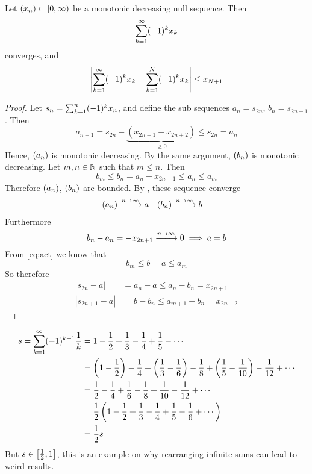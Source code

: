 \documentclass[../../script.tex]{subfiles}
\begin{document}
\begin{thm}\label{thm:alttest}
Let $\seq{x} \subset [0, \infty)$ be a monotonic decreasing null sequence. Then
\[
	\series{k} (-1)^k x_k
\]
converges, and
\[
	\left| \series{k} (-1)^k x_k - \series[N]{k} (-1)^k x_k \right| \le x_{N+1}
\]
\end{thm}
\begin{proof}
Let $s_n = \series[n]{k} (-1)^k x_n$, and define the sub sequences $a_n = s_{2n}$, $b_n = s_{2n+1}$. Then
\begin{equation}
	a_{n+1} = s_{2n} - \underbrace{(x_{2n+1} - x_{2n+2})}_{\ge 0} \le s_{2n} = a_n
\end{equation}
Hence, $\seq{a}$ is monotonic decreasing. By the same argument, $\seq{b}$ is monotonic decreasing. Let $m, n \in \natn$ such that $m \le n$. Then
\begin{equation}\label{eq:act}
	b_m \le b_n = a_n - x_{2n+1} \le a_n \le a_m
\end{equation}
Therefore $\seq{a}$, $\seq{b}$ are bounded. By , these sequence converge
\begin{align}
	\seq{a} &\convinf a & \seq{b} &\convinf b
\end{align}
Furthermore
\begin{equation}
	b_n - a_n = -x_{2n+1} \convinf 0 \implies a = b
\end{equation}
From \cref{eq:act} we know that
\begin{equation}
	b_m \le b = a \le a_m
\end{equation}
So therefore
\begin{align}
	|s_{2n} - a| &= a_n - a \le a_n - b_n = x_{2n+1} \\
	|s_{2n+1} - a| &= b - b_n \le a_{m+1} - b_n = x_{2n+2}
\end{align}
\end{proof}

\begin{eg}
\[
\begin{split}
	s = \series{k} (-1)^{k+1} \rec{k} &= 1 - \rec{2} + \rec{3} - \rec{4} + \rec{5} - \cdots \\
	&= \left(1 - \rec{2}\right) - \rec{4} + \left(\rec{3} - \rec{6}\right) - \rec{8} + \left(\rec{5} - \rec{10}\right) - \rec{12} + \cdots \\
	&= \rec{2} - \rec{4} + \rec{6} - \rec{8} + \rec{10} - \rec{12} + \cdots \\
	&= \rec{2}\left(1 - \rec{2} + \rec{3} - \rec{4} + \rec{5} - \rec{6} + \cdots\right) \\
	&= \rec{2}s
\end{split}
\]
But $s \in \left[\rec{2}, 1\right]$, this is an example on why rearranging infinite sums can lead to weird results.
\end{eg}
\end{document}
